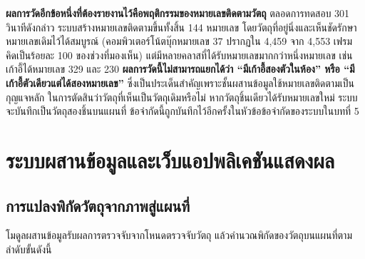 \documentclass[a4paper,12pt]{report}
\begin{document}
\textbf{ผลการวัดอีกข้อหนึ่งที่ต้องรายงานไว้คือพฤติกรรมของหมายเลขติดตามวัตถุ}
ตลอดการทดสอบ 301 วินาทีดังกล่าว ระบบสร้างหมายเลขติดตามขึ้นทั้งสิ้น 144 หมายเลข
โดยวัตถุที่อยู่นิ่งและเห็นชัดรักษาหมายเลขเดิมไว้ได้สมบูรณ์
(คอมพิวเตอร์โน้ตบุ๊กหมายเลข 37 ปรากฏใน 4{,}459 จาก 4{,}553 เฟรม คิดเป็นร้อยละ 100
ของช่วงที่มองเห็น) แต่มีหลายคลาสที่ได้รับหมายเลขมากกว่าหนึ่งหมายเลข
เช่น เก้าอี้ได้หมายเลข 329 และ 230
\textbf{ผลการวัดนี้ไม่สามารถแยกได้ว่า ``มีเก้าอี้สองตัวในห้อง'' หรือ ``มีเก้าอี้ตัวเดียวแต่ได้สองหมายเลข''}
ซึ่งเป็นประเด็นสำคัญเพราะชั้นผสานข้อมูลใช้หมายเลขติดตามเป็นกุญแจหลัก
ในการตัดสินว่าวัตถุที่เห็นเป็นวัตถุเดิมหรือไม่
หากวัตถุชิ้นเดียวได้รับหมายเลขใหม่ ระบบจะบันทึกเป็นวัตถุสองชิ้นบนแผนที่
ข้อจำกัดนี้ถูกบันทึกไว้อีกครั้งในหัวข้อข้อจำกัดของระบบในบทที่ 5


\section{ระบบผสานข้อมูลและเว็บแอปพลิเคชันแสดงผล}

\subsection{การแปลงพิกัดวัตถุจากภาพสู่แผนที่}

โมดูลผสานข้อมูลรับผลการตรวจจับจากโหนดตรวจจับวัตถุ
แล้วคำนวณพิกัดของวัตถุบนแผนที่ตามลำดับขั้นดังนี้
\end{document}
